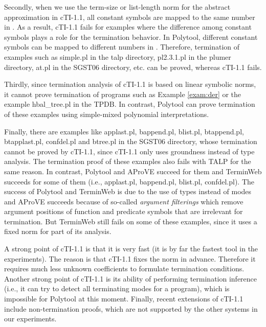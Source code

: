 \documentclass[envcountsame]{tlp}
\newcounter{ex:der-lastsymconsctr}
\begin{document}
Secondly, when we use the term-size or list-length norm for
the abstract approximation in \textsf{cTI-1.1}, all constant symbols are mapped to the same
number in .
As a result, \textsf{cTI-1.1} fails  for examples where
the difference among constant symbols plays a role for the termination
behavior. 
In \textsf{Polytool}, different constant symbols can be mapped to different
numbers in . Therefore, termination of 
examples such as \textsf{simple.pl} in the
\textsf{talp} directory,
\textsf{pl2.3.1.pl} in the \textsf{plumer} directory, \textsf{at.pl} in the
\textsf{SGST06} directory, etc. can be proved, whereas \textsf{cTI-1.1} fails.



Thirdly, since termination analysis of \textsf{cTI-1.1} is based on linear
symbolic norms, it cannot prove termination of
programs such as Example \ref{exam:der} or the example \textsf{hbal\_tree.pl} in
the TPDB. 
In contrast,
\textsf{Polytool} can prove termination of these examples using simple-mixed
polynomial interpretations. 

Finally, there are examples like \textsf{applast.pl},
\textsf{bappend.pl},
\textsf{blist.pl}, \textsf{btappend.pl}, \textsf{btapplast.pl},
  \textsf{confdel.pl} and
\textsf{btree.pl} in the \textsf{SGST06} directory, 
whose termination cannot be proved by
\textsf{cTI-1.1}, since
\textsf{cTI-1.1} only uses groundness instead of type analysis.
The termination proof of these examples also fails with
 \textsf{TALP} for the same reason. In
contrast,
\textsf{Polytool} and \textsf{AProVE}
succeed for them and \textsf{TerminWeb} succeeds for some of them (i.e., \textsf{applast.pl},
	\textsf{bappend.pl}, \textsf{blist.pl}, \textsf{confdel.pl}). The
success of
  \textsf{Polytool} and \textsf{TerminWeb} is due to the use of types
  instead of modes and \textsf{AProVE} succeeds because of
so-called \emph{argument filterings} which
remove argument positions of function and
predicate symbols that are irrelevant for termination.
 But \textsf{TerminWeb} still fails on some of these examples, since it uses a fixed
  norm for part of its analysis.





A strong point of \textsf{cTI-1.1} is that it is very fast (it is by far 
the fastest tool in the experiments). The reason is
that \textsf{cTI-1.1} fixes the norm in advance. Therefore it requires much
less unknown coefficients to formulate termination conditions.  
Another strong point of \textsf{cTI-1.1} is its ability of performing
termination inference (i.e., it can try to detect all terminating modes for a
program), 
which is impossible for \textsf{Polytool} at this
moment. 
Finally, recent extensions of \textsf{cTI-1.1} include non-termination proofs,
which are not supported by the other systems in our experiments.
\end{document}
